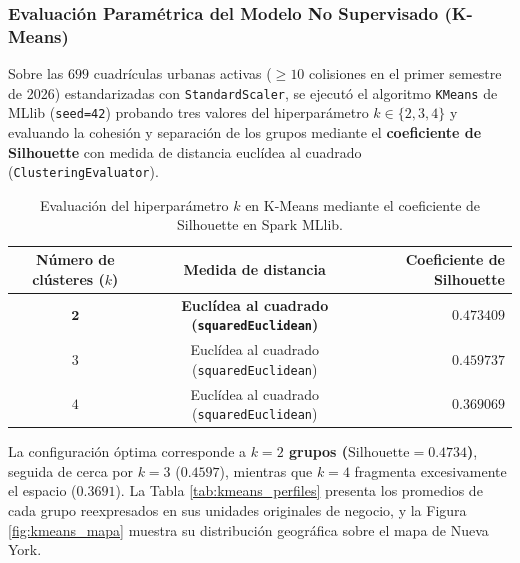 \subsubsection{Evaluación Paramétrica del Modelo No Supervisado (K-Means)}

Sobre las $699$ cuadrículas urbanas activas ($\ge 10$ colisiones en el primer semestre de 2026) estandarizadas con \texttt{StandardScaler}, se ejecutó el algoritmo \texttt{KMeans} de MLlib (\texttt{seed=42}) probando tres valores del hiperparámetro $k \in \{2, 3, 4\}$ y evaluando la cohesión y separación de los grupos mediante el \textbf{coeficiente de Silhouette} con medida de distancia euclídea al cuadrado (\texttt{ClusteringEvaluator}).

\begin{table}[H]
\centering
\small
\renewcommand{\arraystretch}{1.2}
\caption{Evaluación del hiperparámetro $k$ en K-Means mediante el coeficiente de Silhouette en Spark MLlib.}
\label{tab:kmeans_silhouette}
\begin{tabular}{c c r}
\toprule
\textbf{Número de clústeres ($k$)} & \textbf{Medida de distancia} & \textbf{Coeficiente de Silhouette} \\
\midrule
$\mathbf{2}$ & \textbf{Euclídea al cuadrado (\texttt{squaredEuclidean})} & $\mathbf{0.473409}$ \\
$3$ & Euclídea al cuadrado (\texttt{squaredEuclidean}) & $0.459737$ \\
$4$ & Euclídea al cuadrado (\texttt{squaredEuclidean}) & $0.369069$ \\
\bottomrule
\end{tabular}
\end{table}

La configuración óptima corresponde a \textbf{$k = 2$ grupos ($\text{Silhouette} = 0.4734$)}, seguida de cerca por $k = 3$ ($0.4597$), mientras que $k = 4$ fragmenta excesivamente el espacio ($0.3691$). La Tabla \ref{tab:kmeans_perfiles} presenta los promedios de cada grupo reexpresados en sus unidades originales de negocio, y la Figura \ref{fig:kmeans_mapa} muestra su distribución geográfica sobre el mapa de Nueva York.

